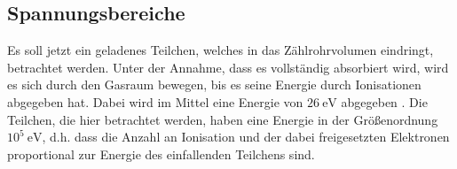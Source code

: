 \subsection{Spannungsbereiche}
\label{sec:spannungsbereiche}

Es soll jetzt ein geladenes Teilchen, welches in das Zählrohrvolumen eindringt, betrachtet werden. Unter
der Annahme, dass es vollständig absorbiert wird, wird es sich durch den Gasraum bewegen, bis es seine 
Energie durch Ionisationen abgegeben hat. Dabei wird im Mittel eine Energie von $26\ \si{\eV}$ 
abgegeben \cite{detektoren}.
Die Teilchen, die hier betrachtet werden, haben eine Energie in der Größenordnung $10^5\ \si{\eV}$, d.h. 
dass die Anzahl an Ionisation und der dabei freigesetzten Elektronen proportional zur Energie des 
einfallenden Teilchens sind.

